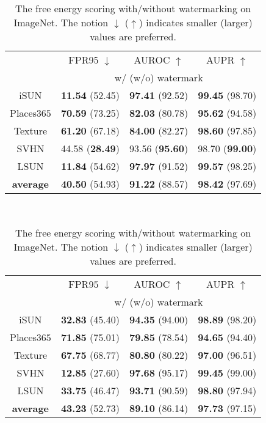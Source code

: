 \documentclass{article}
\begin{document}
\begin{table}[t]
\parbox{.47\linewidth}{
\centering
\caption{{The softmax scoring with/without watermarking on ImageNet. The notion $\downarrow$ ($\uparrow$) indicates smaller (larger) values are preferred.}} \label{tab: imagenet_sm}
\vspace{5pt}
\scriptsize
{
\begin{tabular}{c|ccc}
\toprule[1.5pt]
                   & FPR95 $\downarrow$     & AUROC $\uparrow$       & AUPR $\uparrow$      \\
                   \cline{2-4} 
\multirow{-2}{*}{} & \multicolumn{3}{c}{w/ (w/o) watermark} \\
\midrule[0.6pt]
iSUN               & \textbf{11.54} (52.45) & \textbf{97.41} (92.52) & \textbf{99.45} (98.70) \\
Places$365$        & \textbf{70.59} (73.25) & \textbf{82.03} (80.78) & \textbf{95.62} (94.58) \\
Texture            & \textbf{61.20} ({67.18}) & \textbf{84.00} ({82.27}) & \textbf{98.60} ({97.85}) \\
SVHN               & {44.58} (\textbf{28.49}) & {93.56} (\textbf{95.60}) & {98.70} (\textbf{99.00}) \\
LSUN               & \textbf{11.84} (54.62) & \textbf{97.97} (91.52) & \textbf{99.57} (98.25) \\
\midrule
\textbf{average}   & \textbf{40.50} (54.93) & \textbf{91.22} (88.57) & \textbf{98.42} (97.69) \\ \bottomrule[1.5pt]      
\end{tabular}
}}~~~~
\parbox{.47\linewidth}{
\centering
\caption{{The free energy scoring with/without watermarking on ImageNet. The notion $\downarrow$ ($\uparrow$) indicates smaller (larger) values are preferred.}} \label{tab: imagenet_fe}
\vspace{5pt}
\scriptsize{
\begin{tabular}{c|ccc}
\toprule[1.5pt]
                   & FPR$95$ $\downarrow$     & AUROC $\uparrow$       & AUPR $\uparrow$      \\
                   \cline{2-4} 
\multirow{-2}{*}{} & \multicolumn{3}{c}{w/ (w/o) watermark} \\
\midrule[0.6pt]
iSUN               & \textbf{32.83} (45.40) & \textbf{94.35} (94.00) & \textbf{98.89} (98.20) \\ 
Places$365$        & \textbf{71.85} (75.01) & \textbf{79.85} (78.54) & \textbf{94.65} (94.40) \\
Texture            & \textbf{67.75} (68.77) & \textbf{80.80} (80.22) & \textbf{97.00} (96.51) \\
SVHN               & \textbf{12.85} (27.60) & \textbf{97.68} (95.17) & \textbf{99.45} (99.00) \\
LSUN               & \textbf{33.75} (46.47) & \textbf{93.71} (90.59) & \textbf{98.80} (97.94) \\
\midrule
\textbf{average}   & \textbf{43.23} (52.73) & \textbf{89.10} (86.14) & \textbf{97.73} (97.15) \\ \bottomrule[1.5pt]      
\end{tabular}
}}
\end{table}
\end{document}
